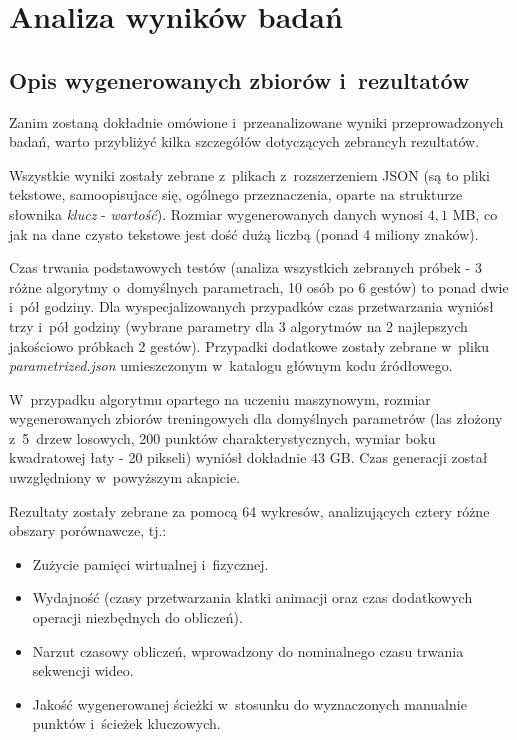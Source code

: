 \chapter{Analiza wyników badań}\label{Chapter_AnalizaRezultatow}

  \section{Opis wygenerowanych zbiorów i~rezultatów}\label{Section_Results}
  Zanim zostaną dokładnie omówione i~przeanalizowane wyniki przeprowadzonych badań, warto przybliżyć kilka szczegółów dotyczących zebrancyh rezultatów.

  Wszystkie wyniki zostały zebrane z~plikach z~rozszerzeniem JSON (są to pliki tekstowe, samoopisujace się, ogólnego przeznaczenia, oparte na strukturze słownika \textit{klucz} - \textit{wartość}). Rozmiar wygenerowanych danych wynosi $4,1$ MB, co jak na dane czysto tekstowe jest dość dużą liczbą (ponad 4 miliony znaków).

  Czas trwania podstawowych testów (analiza wszystkich zebranych próbek - 3 różne algorytmy o~domyślnych parametrach, 10 osób po 6 gestów) to ponad dwie i~pół godziny. Dla wyspecjalizowanych przypadków czas przetwarzania wyniósł trzy i~pół godziny (wybrane parametry dla 3 algorytmów na 2 najlepszych jakościowo próbkach 2 gestów). Przypadki dodatkowe zostały zebrane w~pliku \textit{parametrized.json} umieszczonym w~katalogu głównym kodu źródłowego.

  W~przypadku algorytmu opartego na uczeniu maszynowym, rozmiar wygenerowanych zbiorów treningowych dla domyślnych parametrów (las złożony z~5~drzew losowych, 200 punktów charakterystycznych, wymiar boku kwadratowej łaty - 20 pikseli) wyniósł dokładnie $43$ GB. Czas generacji został uwzględniony w~powyższym akapicie.

  Rezultaty zostały zebrane za pomocą 64 wykresów, analizujących cztery różne obszary porównawcze, tj.:
  \begin{itemize}
    \item Zużycie pamięci wirtualnej i~fizycznej.
    \item Wydajność (czasy przetwarzania klatki animacji oraz czas dodatkowych operacji niezbędnych do obliczeń).
    \item Narzut czasowy obliczeń, wprowadzony do nominalnego czasu trwania sekwencji wideo.
    \item Jakość wygenerowanej ścieżki w~stosunku do wyznaczonych manualnie punktów i~ścieżek kluczowych.
  \end{itemize}

